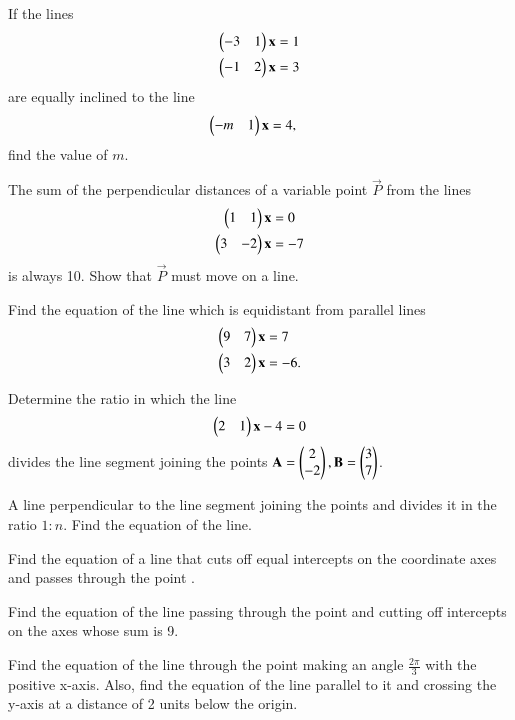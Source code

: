 \item If the lines
%
%
\begin{align}
\begin{pmatrix}-3 & 1\end{pmatrix}\mathbf{x} &= 1
\\
\begin{pmatrix}-1 & 2\end{pmatrix}\mathbf{x} &= 3
\end{align}
%
are equally inclined to the line
%
\begin{align}
\begin{pmatrix}-m & 1\end{pmatrix}\mathbf{x} &= 4,
\end{align}
%
find the value of $m$.
%
\item The sum of the perpendicular distances of a variable point $\vec{P}$ from the lines
%
\begin{align}
\begin{pmatrix}1 & 1\end{pmatrix}\mathbf{x} &= 0
\\
\begin{pmatrix}3 & -2\end{pmatrix}\mathbf{x} &= -7
\end{align}
%
is always 10.  Show that $\vec{P}$ must move on a line.
%
\item Find the equation of the line which is equidistant from parallel lines
%
\begin{align}
\begin{pmatrix}9 & 7\end{pmatrix}\mathbf{x} &= 7
\\
\begin{pmatrix}3 & 2\end{pmatrix}\mathbf{x} &= -6.
\end{align}
%
\item Determine the ratio in which the line 
\begin{align}
\begin{pmatrix}2 & 1\end{pmatrix}\mathbf{x} - 4 = 0
\end{align}
%
divides the line segment joining the points $\mathbf{A}=\begin{pmatrix}2\\-2\end{pmatrix}, \mathbf{B}=\begin{pmatrix}3\\7\end{pmatrix}$.
\item A line perpendicular to the line segment joining the points  and  divides it in the ratio $1:n$.  Find the equation of the line.
\item Find the equation of a line that cuts off equal intercepts on the coordinate axes and passes through the point .
\item Find the equation of the line passing through the point  and cutting off intercepts on the axes whose sum is 9.
\item Find the equation of the line through the point  making an angle $\frac{2\pi}{3}$ with the positive x-axis.  Also, find the equation of the line parallel to it and crossing the y-axis at a distance of 2 units below the origin.
